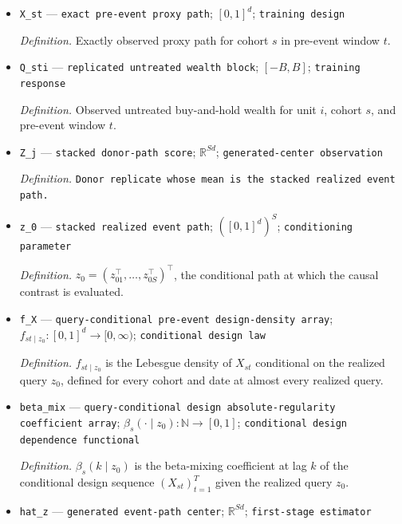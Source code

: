 \documentclass{article}
\begin{document}
\begin{itemize}
  \item \texttt{X\_\allowbreak{}st} --- \texttt{exact pre-\allowbreak{}event proxy path}; \([0,1]^d\); \texttt{training design}
  \par\smallskip\noindent\emph{Definition.} Exactly observed proxy path for cohort \(s\) in pre-event window \(t\).
  \item \texttt{Q\_\allowbreak{}sti} --- \texttt{replicated untreated wealth block}; \([-B,B]\); \texttt{training response}
  \par\smallskip\noindent\emph{Definition.} Observed untreated buy-and-hold wealth for unit \(i\), cohort \(s\), and pre-event window \(t\).
  \item \texttt{Z\_\allowbreak{}j} --- \texttt{stacked donor-\allowbreak{}path score}; \(\mathbb R^{Sd}\); \texttt{generated-\allowbreak{}center observation}
  \par\smallskip\noindent\emph{Definition.} \texttt{Donor replicate whose mean is the stacked realized event path.}
  \item \texttt{z\_\allowbreak{}0} --- \texttt{stacked realized event path}; \(([0,1]^d)^S\); \texttt{conditioning parameter}
  \par\smallskip\noindent\emph{Definition.} \(z_0=(z_{01}^{\top},\ldots,z_{0S}^{\top})^{\top}\), the conditional path at which the causal contrast is evaluated.
  \item \texttt{f\_\allowbreak{}X} --- \texttt{query-\allowbreak{}conditional pre-\allowbreak{}event design-\allowbreak{}density array}; \(f_{st\mid z_0}:[0,1]^d\to[0,\infty)\); \texttt{conditional design law}
  \par\smallskip\noindent\emph{Definition.} \(f_{st\mid z_0}\) is the Lebesgue density of \(X_{st}\) conditional on the realized query \(z_0\), defined for every cohort and date at almost every realized query.
  \item \texttt{beta\_\allowbreak{}mix} --- \texttt{query-\allowbreak{}conditional design absolute-\allowbreak{}regularity coefficient array}; \(\beta_s(\cdot\mid z_0):\mathbb N\to[0,1]\); \texttt{conditional design dependence functional}
  \par\smallskip\noindent\emph{Definition.} \(\beta_s(k\mid z_0)\) is the beta-mixing coefficient at lag \(k\) of the conditional design sequence \((X_{st})_{t=1}^{T}\) given the realized query \(z_0\).
  \item \texttt{hat\_\allowbreak{}z} --- \texttt{generated event-\allowbreak{}path center}; \(\mathbb R^{Sd}\); \texttt{first-\allowbreak{}stage estimator}

\end{itemize}
\end{document}
